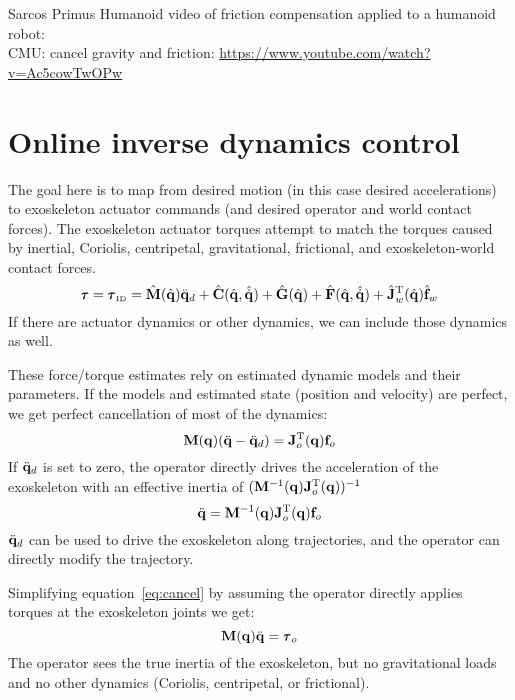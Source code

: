 \documentclass[letterpaper,12pt,fullpage]{article}
\newcommand{\invdyn}{{\mbox {\tiny ID}}}
\begin{document}
Sarcos Primus Humanoid video of friction compensation applied
to a humanoid robot:\\
CMU: cancel gravity and friction: \url{https://www.youtube.com/watch?v=Ac5cowTwOPw}\\

\section{Online inverse dynamics control}

The goal here is to map from desired motion (in this case desired
accelerations) to exoskeleton actuator commands (and desired operator
and world contact forces).
The exoskeleton actuator torques
attempt to match the torques caused by inertial, Coriolis, centripetal,
gravitational, frictional, and exoskeleton-world contact forces.
\begin{equation}
\vtau = \vtau_{\invdyn} 
= \hat{\mM}(\hat{\vq}) \ddot{\vq}_d
+ \hat{\mC}(\hat{\vq},\hat{\dot{\vq}})
+ \hat{\mG}(\hat{\vq})
+ \hat{\mF}(\hat{\vq},\hat{\dot{\vq}})
+ \hat{\mJ}_w^{\tr}(\hat{\vq}) \hat{\vf}_w
\end{equation}
If there are actuator dynamics or other dynamics, we can include those
dynamics as well.

These force/torque estimates rely on estimated dynamic models and their parameters.
If the models and estimated state (position and velocity) are perfect, we get
perfect cancellation of most of the dynamics:
\begin{equation}
{\bf M}({\bf q}) (\ddot{{\bf q}} - \ddot{{\bf q}}_d) = {\bf J}_o^{{\rm T}}({\bf q}) {\bf f}_o
\end{equation}
If $\ddot{{\bf q}}_d$ is set to zero, the operator directly drives the acceleration
of the exoskeleton with an effective inertia of $({\bf M}^{-1}({\bf q}) {\bf J}_o^{{\rm T}}({\bf q}))^{-1}$
\begin{equation}
\ddot{{\bf q}} = {\bf M}^{-1}({\bf q}) {\bf J}_o^{{\rm T}}({\bf q}) {\bf f}_o
\label{eq:cancel}
\end{equation}
$\ddot{{\bf q}}_d$ can be used to drive the exoskeleton along trajectories, and
the operator can directly modify the trajectory.

Simplifying equation~\ref{eq:cancel} by 
assuming the operator directly applies torques at the
exoskeleton joints we get:
\begin{equation}
\mM (\vq) \ddot{\vq} = \vtau_o
\end{equation}
The operator sees the true inertia of the exoskeleton, but no gravitational
loads and no other dynamics (Coriolis, centripetal, or frictional).
\end{document}
